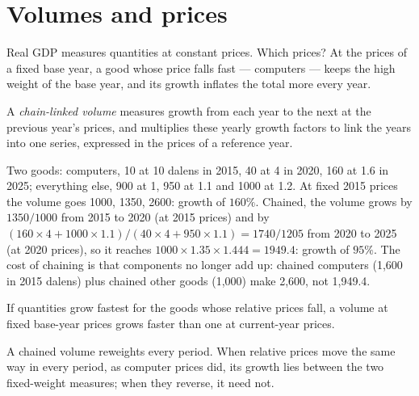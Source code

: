 \section{Volumes and prices}\label{sec:b1:national-accounts-in-depth:volumes}

Real GDP measures quantities at constant prices. Which prices? At the
prices of a fixed base year, a good whose price falls fast --- computers ---
keeps the high weight of the base year, and its growth inflates the total
more every year.

\begin{definition}\label{def:b1:national-accounts-in-depth:chain-linked}
A \emph{chain-linked volume} measures growth from each year to the next at
the previous year's prices, and multiplies these yearly growth factors to
link the years into one series, expressed in the prices of a reference year.
\end{definition}

\begin{measure}
Two goods: computers, 10 at 10 dalens in 2015, 40 at 4 in 2020, 160 at 1.6 in
2025; everything else, 900 at 1, 950 at 1.1 and 1000 at 1.2. At fixed 2015
prices the volume goes 1000, 1350, 2600: growth of $160\%$. Chained, the volume
grows by $1350/1000$ from 2015 to 2020 (at 2015 prices) and by
$(160 \times 4 + 1000 \times 1.1)/(40 \times 4 + 950 \times 1.1) = 1740/1205$ from 2020 to 2025 (at 2020 prices), so it
reaches $1000 \times 1.35 \times 1.444 = 1949.4$: growth of $95\%$. The cost of chaining is
that components no longer add up: chained computers (1,600 in 2015
dalens) plus chained other goods (1,000) make 2,600, not 1,949.4.
\end{measure}

\begin{proposition}\label{prop:b1:national-accounts-in-depth:fixed}
If quantities grow fastest for the goods whose relative prices fall, a
volume at fixed base-year prices grows faster than one at current-year
prices.
\end{proposition}

\begin{remark}
A chained volume reweights every period. When relative prices move the
same way in every period, as computer prices did, its growth lies between
the two fixed-weight measures; when they reverse, it need not.
\end{remark}

